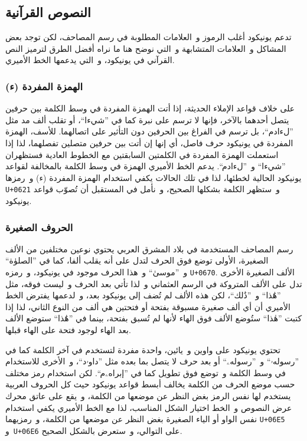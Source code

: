 \documentclass[a4paper]{article}
\renewcommand\U[1]{\colorbox{codecolor}{\texttt{U+#1}}} %
\begin{document}
\subsection{النصوص القرآنية}
\label{ref:quranic-text}
تدعم يونيكود أغلب الرموز و العلامات المطلوبة في رسم المصاحف، لكن توجد
بعض المشاكل و العلامات المتشابهة و التي نوضح هنا ما نراه أفضل الطرق
لترميز النص القرآني في يونيكود، و التي يدعمها الخط الأميري.

\subsubsection{الهمزة المفردة (\textup{\arabicfont ء})}
على خلاف قواعد الإملاء الحديثة، إذا أتت الهمزة المفردة في وسط الكلمة بين
حرفين يتصل أحدهما بالآخر، فإنها لا ترسم على نبرة كما في ”شيءا“، أو تقلب
ألف مد مثل ”لءادم“، بل ترسم في الفراغ بين الحرفين دون التأثير على
اتصالهما. للأسف، الهمزة المفردة في يونيكود حرف فاصل، أي إنها إن أتت بين
حرفين متصلين تفصلهما، لذا إذا استعملت الهمزة المفردة في الكلمتين
السابقتين مع الخطوط العادية فستظهران ”شي‌ء‌ا“
و ”ل‌ء‌ادم“. يدعم الخط الأميري الهمزة في وسط الكلمة بالمخالفة
لقواعد يونيكود الحالية لخطئها، لذا في تلك الحالات يكفي استخدام الهمزة
المفردة (ء) و رمزها \U{0621} و ستظهر الكلمة بشكلها الصحيح، و نأمل
في المستقبل أن تُصوّب قواعد يونيكود.

\subsubsection{الحروف الصغيرة}
\begin{description}[style=nextline]
\item[الألف الصغيرة (◌ٰ)]
	رسم المصاحف المستخدمة في بلاد المشرق العربي يحتوي نوعين مختلفين من
	الألف الصغيرة، الأولى توضع فوق الحرف لتدل على أنه يقلب ألفا، كما في
	”الصلوٰة“ و ”موسىٰ“ و هذا الحرف موجود في يونيكود، و رمزه
	\U{0670}. الألف الصغيرة الأخرى تدل على الألف المتروكة في
	الرسم العثماني و لذا تأتي بعد الحرف و ليست فوقه، مثل ”هَٰذا“ و ”ذَٰلك“،
	لكن هذه الألف لم تُضف إلى يونيكود بعد، و لدعمها يفترض الخط الأميري أن
	أي ألف صغيرة مسبوقة بفتحة أو فتحتين هي ألف من النوع الثاني، لذا إذا
	كتبت ”هٰذا“ ستُوضع الألف فوق الهاء لأنها لم تُسبق بفتحة، بينما في ”هَٰذا“
	ستوضع الألف بعد الهاء لوجود فتحة على الهاء قبلها.

\item[الواو (ۥ) و الياء (ۦ) الصغيرتين]
	تحتوي يونيكود على واوين و يائين، واحدة مفردة لتستخدم في آخر الكلمة
	كما في ”رسولهۥ“ و ”رسولهۦ“ أو بعد حرف لا يتصل بما بعده مثل ”داوۥد“،
	و الأخرى للاستخدام في وسط الكلمة و توضع فوق تطويل كما في ”إبراهۦم“.
	لكن استخدام رمز مختلف حسب موضع الحرف من الكلمة يخالف أبسط قواعد
	يونيكود حيث كل الحروف العربية يستخدم لها نفس الرمز بغض النظر عن
	موضعها من الكلمة، و يقع على عاتق محرك عرض النصوص و الخط اختيار الشكل
	المناسب، لذا مع الخط الأميري يكفي استخدام نفس الواو أو الياء الصغيرة
	بغض النظر عن موضعها من الكلمة، و رمزيهما \U{06E5}
	و \U{06E6} على التوالي، و ستعرض بالشكل الصحيح.
\end{description}
\end{document}

